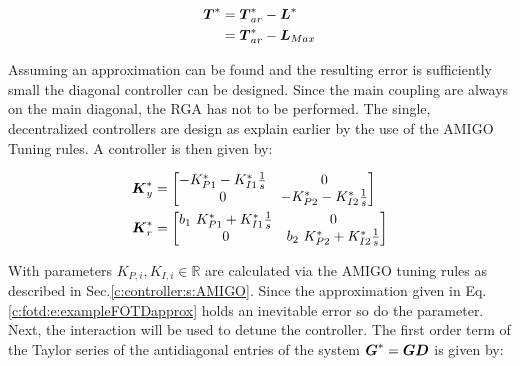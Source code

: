 \begin{align}
\begin{split}
\mbox{\boldmath$T$}^* &= \mbox{\boldmath$T$}_{ar}^* - \mbox{\boldmath$L$}^* \\
&= \mbox{\boldmath$T$}_{ar}^* - \mbox{\boldmath$L$}_{Max} 
\end{split}
\label{c:fotd:e:CombinationTimeConstant}
\end{align}

Assuming an approximation can be found and the resulting error is sufficiently small the diagonal controller can be designed. Since the main coupling are always on the main diagonal, the RGA has not to be performed. The single, decentralized controllers are design as explain earlier by the use of the AMIGO Tuning rules. A controller is then given by:

\begin{align}
\begin{split}
\mbox{\boldmath$K$}_y^* &= \begin{bmatrix}
-K_{P1}^* - K_{I1}^*\frac{1}{s} & 0 \\
0 & -K_{P2}^* - K_{I2}^*\frac{1}{s}
\end{bmatrix} \\
\mbox{\boldmath$K$}_r^* &= \begin{bmatrix}
b_1~K_{P1}^* + K_{I1}^*\frac{1}{s} & 0 \\
0 & b_2~K_{P2}^* + K_{I2}^*\frac{1}{s}
\end{bmatrix} 
\end{split}
\label{c:fotd:e:exampleTransformedControler}
\end{align}

%  

With parameters $K_{P,i},K_{I,i} \in \mathbb{R}$ are calculated via the AMIGO tuning rules as described in Sec.\ref{c:controller:s:AMIGO}. Since the approximation given in Eq.\ref{c:fotd:e:exampleFOTDapprox} holds an inevitable error so do the parameter. \\

Next, the interaction will be used to detune the controller. The first order term of the Taylor series of the antidiagonal entries of the system $\mbox{\boldmath$G$}^* = \mbox{\boldmath$G$} \mbox{\boldmath$D$}$ is given by:

